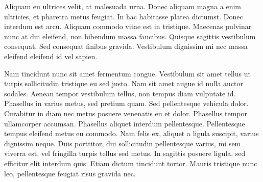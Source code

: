 Aliquam eu ultrices velit, at malesuada urna. Donec aliquam magna a enim ultricies, et pharetra metus feugiat. In hac habitasse platea dictumst. Donec interdum est arcu. Aliquam commodo vitae est in tristique. Maecenas pulvinar nunc at dui eleifend, non bibendum massa faucibus. Quisque sagittis vestibulum consequat. Sed consequat finibus gravida. Vestibulum dignissim mi nec massa eleifend eleifend id vel sapien.

Nam tincidunt nunc sit amet fermentum congue. Vestibulum sit amet tellus ut turpis sollicitudin tristique eu sed justo. Nam sit amet augue id nulla auctor sodales. Aenean tempor vestibulum tellus, non tempus diam vulputate id. Phasellus in varius metus, sed pretium quam. Sed pellentesque vehicula dolor. Curabitur in diam nec metus posuere venenatis eu et dolor. Phasellus tempor ullamcorper accumsan. Phasellus aliquet interdum pellentesque. Pellentesque tempus eleifend metus eu commodo. Nam felis ex, aliquet a ligula suscipit, varius dignissim neque. Duis porttitor, dui sollicitudin pellentesque varius, mi sem viverra est, vel fringilla turpis tellus sed metus. In sagittis posuere ligula, sed efficitur elit interdum quis. Etiam dictum tincidunt tortor. Mauris tristique nunc leo, pellentesque feugiat risus gravida nec.